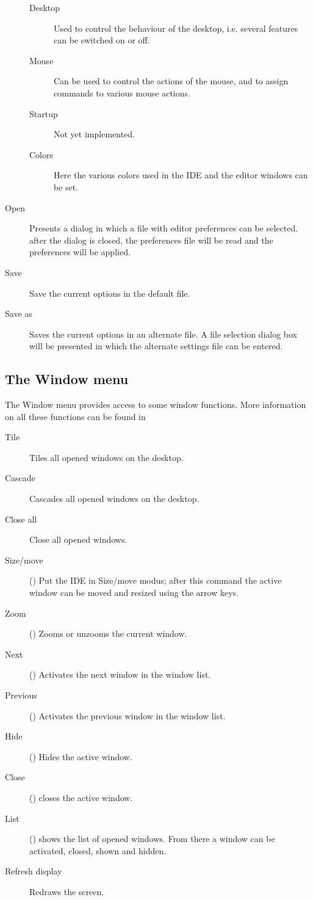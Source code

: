 \begin{description}
\begin{description}
\item[Desktop]
Used to control the behaviour of the desktop, i.e. several features can be
switched on or off.
\item[Mouse]
Can be used to control the actions of the mouse, and to assign commands to
various mouse actions.
\item[Startup]
Not yet implemented.
\item[Colors]
Here the various colors used in the IDE and the editor windows can be set.
\end{description}
\item[Open]
Presents a dialog in which a file with editor preferences can be selected. 
after the dialog is closed, the preferences file will be read and the
preferences will be applied.
\item[Save]
Save the current options in the default file.
\item[Save as]
Saves the current options in an alternate file. A file selection dialog box
will be presented in which the alternate settings file can be entered.
\end{description}
%
%
\subsection{The Window menu}
\label{se:menuwindow}
The Window menu provides access to some window functions. More information
on all these functions can be found in 
\begin{description}
\item[Tile]
Tiles all opened windows on the desktop.
\item[Cascade]
Cascades all opened windows on the desktop.
\item[Close all]
Close all opened windows.
\item[Size/move] ()
Put the IDE in Size/move modus; after this command the active window can be
moved and resized using the arrow keys.
\item[Zoom] ()
Zooms or unzooms the current window. 
\item[Next] ()
Activates the next window in the window list.
\item[Previous] ()
Activates the previous window in the window list.
\item[Hide] ()
Hides the active window. 
\item[Close] () closes the active window.
\item[List] () shows the list of opened windows. From there a
window can be activated, closed, shown and hidden.
\item[Refresh display]
Redraws the screen.
\end{description}
%
%
